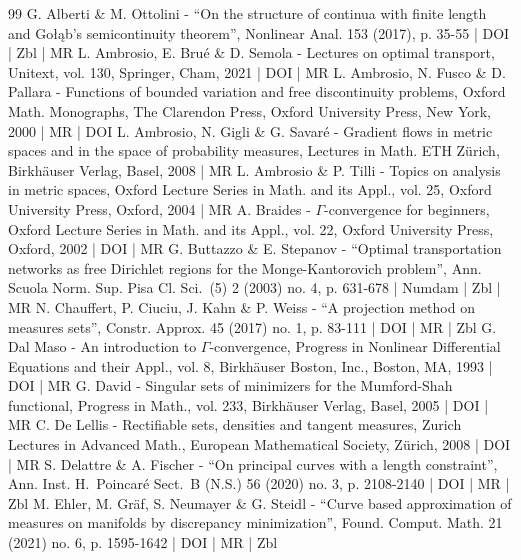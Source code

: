 \begin{thebibliography}{99}
G. Alberti \& M. Ottolini - “On the structure of continua with finite length and Gołąb’s semicontinuity theorem”, Nonlinear Anal. 153 (2017), p. 35-55 | DOI | Zbl | MR
L. Ambrosio, E. Brué \& D. Semola - Lectures on optimal transport, Unitext, vol. 130, Springer, Cham, 2021 | DOI | MR
L. Ambrosio, N. Fusco \& D. Pallara - Functions of bounded variation and free discontinuity problems, Oxford Math. Monographs, The Clarendon Press, Oxford University Press, New York, 2000 | MR | DOI
L. Ambrosio, N. Gigli \& G. Savaré - Gradient flows in metric spaces and in the space of probability measures, Lectures in Math. ETH Zürich, Birkhäuser Verlag, Basel, 2008 | MR
L. Ambrosio \& P. Tilli - Topics on analysis in metric spaces, Oxford Lecture Series in Math. and its Appl., vol. 25, Oxford University Press, Oxford, 2004 | MR
A. Braides - $\Gamma $-convergence for beginners, Oxford Lecture Series in Math. and its Appl., vol. 22, Oxford University Press, Oxford, 2002 | DOI | MR
G. Buttazzo \& E. Stepanov - “Optimal transportation networks as free Dirichlet regions for the Monge-Kantorovich problem”, Ann. Scuola Norm. Sup. Pisa Cl. Sci. (5) 2 (2003) no. 4, p. 631-678 | Numdam | Zbl | MR
N. Chauffert, P. Ciuciu, J. Kahn \& P. Weiss - “A projection method on measures sets”, Constr. Approx. 45 (2017) no. 1, p. 83-111 | DOI | MR | Zbl
G. Dal Maso - An introduction to $\Gamma $-convergence, Progress in Nonlinear Differential Equations and their Appl., vol. 8, Birkhäuser Boston, Inc., Boston, MA, 1993 | DOI | MR
G. David - Singular sets of minimizers for the Mumford-Shah functional, Progress in Math., vol. 233, Birkhäuser Verlag, Basel, 2005 | DOI | MR
C. De Lellis - Rectifiable sets, densities and tangent measures, Zurich Lectures in Advanced Math., European Mathematical Society, Zürich, 2008 | DOI | MR
S. Delattre \& A. Fischer - “On principal curves with a length constraint”, Ann. Inst. H. Poincaré Sect. B (N.S.) 56 (2020) no. 3, p. 2108-2140 | DOI | MR | Zbl
M. Ehler, M. Gräf, S. Neumayer \& G. Steidl - “Curve based approximation of measures on manifolds by discrepancy minimization”, Found. Comput. Math. 21 (2021) no. 6, p. 1595-1642 | DOI | MR | Zbl

\end{thebibliography}
